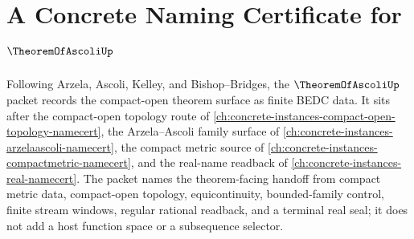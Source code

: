\chapter{A Concrete Naming Certificate for $\TheoremOfAscoliUp$}
\label{ch:concrete-instances-theorem-of-ascoli-namecert}

Following Arzela, Ascoli, Kelley, and Bishop--Bridges, the $\TheoremOfAscoliUp$ packet records the compact-open theorem surface as finite BEDC data. It sits after the compact-open topology route of \autoref{ch:concrete-instances-compact-open-topology-namecert}, the Arzela--Ascoli family surface of \autoref{ch:concrete-instances-arzelaascoli-namecert}, the compact metric source of \autoref{ch:concrete-instances-compactmetric-namecert}, and the real-name readback of \autoref{ch:concrete-instances-real-namecert}. The packet names the theorem-facing handoff from compact metric data, compact-open topology, equicontinuity, bounded-family control, finite stream windows, regular rational readback, and a terminal real seal; it does not add a host function space or a subsequence selector.

